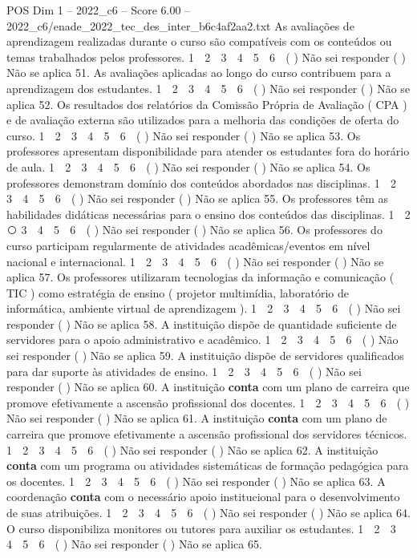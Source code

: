 \begin{textsample}{POS Dim 1 – 2022\_c6 – Score 6.00 – 2022\_c6/enade\_2022\_tec\_des\_inter\_b6c4af2aa2.txt}
As avaliações de aprendizagem realizadas durante o curso são compatíveis com os conteúdos ou temas trabalhados pelos professores. 1 ⃝ 2 ⃝ 3 ⃝ 4 ⃝ 5 ⃝ 6 ⃝ ( ) Não sei responder ( ) Não se aplica 51.
As avaliações aplicadas ao longo do curso contribuem para a aprendizagem dos estudantes. 1 ⃝ 2 ⃝ 3 ⃝ 4 ⃝ 5 ⃝ 6 ⃝ ( ) Não sei responder ( ) Não se aplica 52.
Os resultados dos relatórios da Comissão Própria de Avaliação ( CPA ) e de avaliação externa são utilizados para a melhoria das condições de oferta do curso. 1 ⃝ 2 ⃝ 3 ⃝ 4 ⃝ 5 ⃝ 6 ⃝ ( ) Não sei responder ( ) Não se aplica 53.
Os professores apresentam disponibilidade para atender os estudantes fora do horário de aula. 1 ⃝ 2 ⃝ 3 ⃝ 4 ⃝ 5 ⃝ 6 ⃝ ( ) Não sei responder ( ) Não se aplica 54.
Os professores demonstram domínio dos conteúdos abordados nas disciplinas. 1 ⃝ 2 ⃝ 3 ⃝ 4 ⃝ 5 ⃝ 6 ⃝ ( ) Não sei responder ( ) Não se aplica 55.
Os professores têm as habilidades didáticas necessárias para o ensino dos conteúdos das disciplinas. 1 ⃝ 2 ⃝ 3 ⃝ 4 ⃝ 5 ⃝ 6 ⃝ ( ) Não sei responder ( ) Não se aplica 56.
Os professores do curso participam regularmente de atividades acadêmicas/eventos em nível nacional e internacional. 1 ⃝ 2 ⃝ 3 ⃝ 4 ⃝ 5 ⃝ 6 ⃝ ( ) Não sei responder ( ) Não se aplica 57.
Os professores utilizaram tecnologias da informação e comunicação ( TIC ) como estratégia de ensino ( projetor multimídia, laboratório de informática, ambiente virtual de aprendizagem ). 1 ⃝ 2 ⃝ 3 ⃝ 4 ⃝ 5 ⃝ 6 ⃝ ( ) Não sei responder ( ) Não se aplica 58.
A instituição dispõe de quantidade suficiente de servidores para o apoio administrativo e acadêmico. 1 ⃝ 2 ⃝ 3 ⃝ 4 ⃝ 5 ⃝ 6 ⃝ ( ) Não sei responder ( ) Não se aplica 59.
A instituição dispõe de servidores qualificados para dar suporte às atividades de ensino. 1 ⃝ 2 ⃝ 3 ⃝ 4 ⃝ 5 ⃝ 6 ⃝ ( ) Não sei responder ( ) Não se aplica 60.
A instituição \textbf{conta} com um plano de carreira que promove efetivamente a ascensão profissional dos docentes. 1 ⃝ 2 ⃝ 3 ⃝ 4 ⃝ 5 ⃝ 6 ⃝ ( ) Não sei responder ( ) Não se aplica 61.
A instituição \textbf{conta} com um plano de carreira que promove efetivamente a ascensão profissional dos servidores técnicos. 1 ⃝ 2 ⃝ 3 ⃝ 4 ⃝ 5 ⃝ 6 ⃝ ( ) Não sei responder ( ) Não se aplica 62.
A instituição \textbf{conta} com um programa ou atividades sistemáticas de formação pedagógica para os docentes. 1 ⃝ 2 ⃝ 3 ⃝ 4 ⃝ 5 ⃝ 6 ⃝ ( ) Não sei responder ( ) Não se aplica 63.
A coordenação \textbf{conta} com o necessário apoio institucional para o desenvolvimento de suas atribuições. 1 ⃝ 2 ⃝ 3 ⃝ 4 ⃝ 5 ⃝ 6 ⃝ ( ) Não sei responder ( ) Não se aplica 64.
O curso disponibiliza monitores ou tutores para auxiliar os estudantes. 1 ⃝ 2 ⃝ 3 ⃝ 4 ⃝ 5 ⃝ 6 ⃝ ( ) Não sei responder ( ) Não se aplica 65.

\end{textsample}

